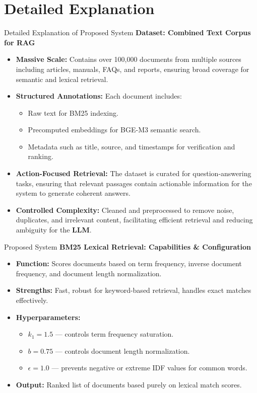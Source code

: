 \section{Detailed Explanation}

\begin{frame}{Detailed Explanation of Proposed System}
\textbf{Dataset: Combined Text Corpus for RAG}

\begin{itemize}
    \item \small \textbf{Massive Scale:} Contains over 100,000 documents from multiple sources including articles, manuals, FAQs, and reports, ensuring broad coverage for semantic and lexical retrieval.
    \item \small \textbf{Structured Annotations:} Each document includes:
        \begin{itemize}
            \item Raw text for BM25 indexing.
            \item Precomputed embeddings for BGE-M3 semantic search.
            \item Metadata such as title, source, and timestamps for verification and ranking.
        \end{itemize}
    \item \small \textbf{Action-Focused Retrieval:} The dataset is curated for question-answering tasks, ensuring that relevant passages contain actionable information for the system to generate coherent answers.
    \item \small \textbf{Controlled Complexity:} Cleaned and preprocessed to remove noise, duplicates, and irrelevant content, facilitating efficient retrieval and reducing ambiguity for the \textbf{LLM}.
\end{itemize}
\end{frame}

\begin{frame}{Proposed System}
\textbf{BM25 Lexical Retrieval: Capabilities & Configuration}

\begin{itemize}
    \item \textbf{Function:} Scores documents based on term frequency, inverse document frequency, and document length normalization.
    \item \textbf{Strengths:} Fast, robust for keyword-based retrieval, handles exact matches effectively.
    \item \textbf{Hyperparameters:}
        \begin{itemize}
            \item $k_1 = 1.5$ — controls term frequency saturation.
            \item $b = 0.75$ — controls document length normalization.
            \item $\epsilon = 1.0$ — prevents negative or extreme IDF values for common words.
        \end{itemize}
    \item \textbf{Output:} Ranked list of documents based purely on lexical match scores.
\end{itemize}
\end{frame}

